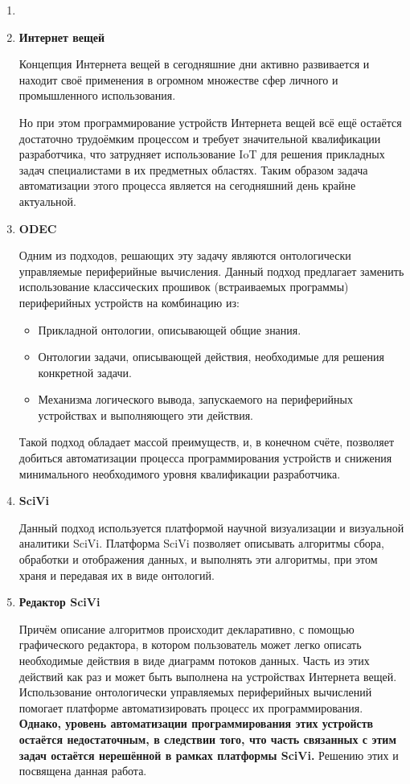 \documentclass[14pt]{extarticle}
\begin{document}
\begin{enumerate}
	\item \textbf{}

	\item \textbf{Интернет вещей}

	Концепция Интернета вещей в сегодняшние дни активно развивается и находит своё применения в огромном множестве сфер личного и промышленного использования.

	Но при этом программирование устройств Интернета вещей всё ещё остаётся достаточно трудоёмким процессом и требует значительной квалификации разработчика, что затрудняет использование IoT для решения прикладных задач специалистами в их предметных областях.
	Таким образом задача автоматизации этого процесса является на сегодняшний день крайне актуальной.

	\item \textbf{ODEC}

	Одним из подходов, решающих эту задачу являются онтологически управляемые периферийные вычисления.
	Данный подход предлагает заменить использование классических прошивок (встраиваемых программы) периферийных устройств на комбинацию из:
	\begin{itemize}
		\item Прикладной онтологии, описывающей общие знания.
		\item Онтологии задачи, описывающей действия, необходимые для решения конкретной задачи.
		\item Механизма логического вывода, запускаемого на периферийных устройствах и выполняющего эти действия.
	\end{itemize}
	Такой подход обладает массой преимуществ, и, в конечном счёте, позволяет добиться автоматизации процесса программирования устройств и снижения минимального необходимого уровня квалификации разработчика.

	\item \textbf{SciVi}

	Данный подход используется платформой научной визуализации и визуальной аналитики SciVi.
	Платформа SciVi позволяет описывать алгоритмы сбора, обработки и отображения данных, и выполнять эти алгоритмы, при этом храня и передавая их в виде онтологий.

	\item \textbf{Редактор SciVi}

	Причём описание алгоритмов происходит декларативно, с помощью графического редактора, в котором пользователь может легко описать необходимые действия в виде диаграмм потоков данных.
	Часть из этих действий как раз и может быть выполнена на устройствах Интернета вещей.
	Использование онтологически управляемых периферийных вычислений помогает платформе автоматизировать процесс их программирования. 
	\textbf{Однако, уровень автоматизации программирования этих устройств остаётся недостаточным, в следствии того, что часть связанных с этим задач остаётся нерешённой в рамках платформы SciVi.}
	Решению этих и посвящена данная работа.


\end{enumerate}
\end{document}
